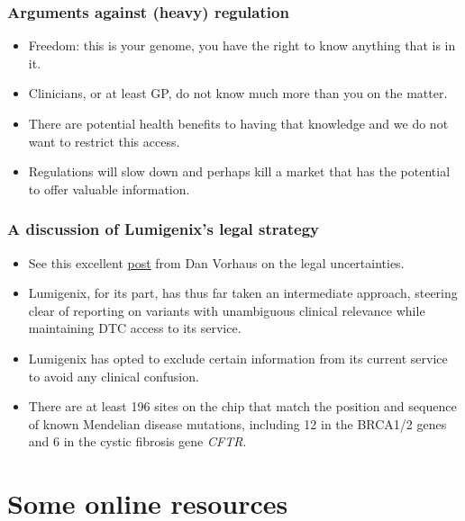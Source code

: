 \documentclass{beamer}
\begin{document}
\begin{frame}
  \frametitle{Arguments against (heavy) regulation}
  \begin{itemize}
  \item Freedom: this is your genome, you have the right to know anything that is in it.
  \item Clinicians, or at least GP, do not know much more than you on the matter.
  \item There are potential health benefits to having that knowledge and we do not want to restrict this access.
  \item Regulations will slow down and perhaps kill a market that has the potential to offer valuable information.
  \end{itemize}
\end{frame}



\begin{frame}
  \frametitle{A discussion of Lumigenix's legal strategy}
  \begin{itemize}
  \item See this excellent \href{http://www.genomicslawreport.com/index.php/2011/06/16/dtc-genetic-testing-and-the-fda-is-there-an-end-in-sight-to-the-regulatory-uncertainty/}{post} from Dan Vorhaus on the legal uncertainties.
  \item Lumigenix, for its part, has thus far taken an intermediate approach, steering clear of reporting on variants with unambiguous clinical relevance while maintaining DTC access to its service.
  \item Lumigenix has opted to exclude certain information from its current service to avoid any clinical confusion.
  \item There are at least 196 sites on the chip that match the position and sequence of known Mendelian disease mutations, including 12 in the BRCA1/2 genes and 6 in the cystic fibrosis gene {\it CFTR}.
  \end{itemize}
\end{frame}

\section{Some online resources}
\end{document}
